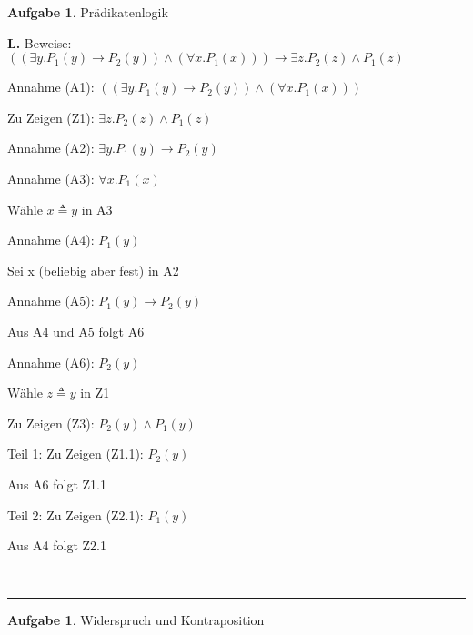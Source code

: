 \documentclass[10pt,leqno ]{article}
\theoremstyle{definition}
\newtheorem{problem}[theorem]{Aufgabe}
\newenvironment{solution}[1][L]{\begin{doublespace}\textbf{#1.}\quad }{\ \rule{0.5em}{0.5em}\end{doublespace}}
\begin{document}
\begin{problem}
    Prädikatenlogik
\end{problem}

\begin{solution}
Beweise: \( ((\exists y . P_1(y) \rightarrow P_2(y)) \land (\forall x . P_1(x))) \rightarrow \exists z . P_2(z) \land P_1(z) \)

Annahme (A1): \( ((\exists y . P_1(y) \rightarrow P_2(y)) \land (\forall x . P_1(x))) \)

Zu Zeigen (Z1): \( \exists z . P_2(z) \land P_1(z) \)

Annahme (A2): \( \exists y . P_1(y) \rightarrow P_2(y) \)

Annahme (A3): \( \forall x . P_1(x) \)

Wähle \(  x \triangleq y \) in A3

Annahme (A4): \( P_1(y) \)

Sei x (beliebig aber fest) in A2

Annahme (A5): \( P_1(y) \rightarrow P_2(y) \)

Aus A4 und A5 folgt A6

Annahme (A6): \( P_2(y) \)

Wähle \( z \triangleq y \) in Z1

Zu Zeigen (Z3): \( P_2(y) \land P_1(y) \)

Teil 1: Zu Zeigen (Z1.1): \( P_2(y) \)

\qquad Aus A6 folgt Z1.1

Teil 2: Zu Zeigen (Z2.1): \( P_1(y) \)

\qquad Aus A4 folgt Z2.1

\end{solution}

\begin{problem}
    Widerspruch und Kontraposition
\end{problem}
\end{document}
